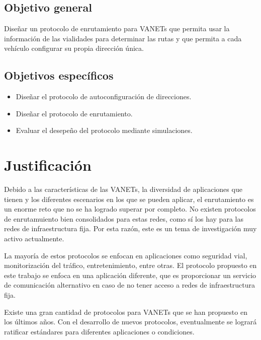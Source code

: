 \label{subsec:objetivos}


\subsection{Objetivo general}
\label{subsec:objetivo_general}

Diseñar un protocolo de enrutamiento para VANETs que permita usar la información
de las vialidades para determinar las rutas y que permita a cada vehículo
configurar su propia dirección única.


\subsection{Objetivos específicos}
\label{subsec:objetivos_especificos}

\begin{itemize}
  \item Diseñar el protocolo de autoconfiguración de direcciones.
  \item Diseñar el protocolo de enrutamiento.
  \item Evaluar el desepeño del protocolo mediante simulaciones.
\end{itemize}


\section{Justificación}
\label{sec:justificacion}

Debido a las características de las VANETs, la diversidad de aplicaciones que
tienen y los diferentes escenarios en los que se pueden aplicar, el enrutamiento
es un enorme reto que no se ha logrado superar por completo. No existen
protocolos de enrutamuiento bien consolidados para estas redes, como sí los hay
para las redes de infraestructura fija. Por esta razón, este es un tema de
investigación muy activo actualmente.

La mayoría de estos protocolos se enfocan en aplicaciones como seguridad vial,
monitorización del tráfico, entretenimiento, entre otras. El protocolo
propuesto en este trabajo se enfoca en una aplicación diferente, que es
proporcionar un servicio de comunicación alternativo en caso de no tener acceso
a redes de infraestructura fija.

Existe una gran cantidad de protocolos para VANETs que se han propuesto en los
últimos años. Con el desarrollo de nuevos protocolos, eventualmente se
logrará ratificar estándares para diferentes aplicaciones o condiciones.
